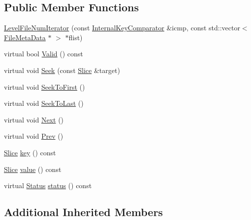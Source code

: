 \subsection*{Public Member Functions}
\begin{DoxyCompactItemize}
\item 
\mbox{\hyperlink{classleveldb_1_1_version_1_1_level_file_num_iterator_a7d9b5b7c74d74974ae322d20535f112a}{Level\+File\+Num\+Iterator}} (const \mbox{\hyperlink{classleveldb_1_1_internal_key_comparator}{Internal\+Key\+Comparator}} \&icmp, const std\+::vector$<$ \mbox{\hyperlink{structleveldb_1_1_file_meta_data}{File\+Meta\+Data}} $\ast$ $>$ $\ast$flist)
\item 
virtual bool \mbox{\hyperlink{classleveldb_1_1_version_1_1_level_file_num_iterator_a9bf0e045961ed325d37bfaa8b2c77e8b}{Valid}} () const
\item 
virtual void \mbox{\hyperlink{classleveldb_1_1_version_1_1_level_file_num_iterator_adbe855f4a783c2f578e1ff2fbb5259b2}{Seek}} (const \mbox{\hyperlink{classleveldb_1_1_slice}{Slice}} \&target)
\item 
virtual void \mbox{\hyperlink{classleveldb_1_1_version_1_1_level_file_num_iterator_a8e5d34bf0c1e17e83bbb9941821a7ee2}{Seek\+To\+First}} ()
\item 
virtual void \mbox{\hyperlink{classleveldb_1_1_version_1_1_level_file_num_iterator_ac7fafc33c049d1e33fdf9b5ae99f73d8}{Seek\+To\+Last}} ()
\item 
virtual void \mbox{\hyperlink{classleveldb_1_1_version_1_1_level_file_num_iterator_a7f470d4bd4dd27ff653bd1e61ccfd759}{Next}} ()
\item 
virtual void \mbox{\hyperlink{classleveldb_1_1_version_1_1_level_file_num_iterator_ab39c60a98d579590231034fdb665cb42}{Prev}} ()
\item 
\mbox{\hyperlink{classleveldb_1_1_slice}{Slice}} \mbox{\hyperlink{classleveldb_1_1_version_1_1_level_file_num_iterator_af89babdc6efb44a125b9ec597fc96bd8}{key}} () const
\item 
\mbox{\hyperlink{classleveldb_1_1_slice}{Slice}} \mbox{\hyperlink{classleveldb_1_1_version_1_1_level_file_num_iterator_af7b7da923a316d8b85f7194c926470db}{value}} () const
\item 
virtual \mbox{\hyperlink{classleveldb_1_1_status}{Status}} \mbox{\hyperlink{classleveldb_1_1_version_1_1_level_file_num_iterator_a173217ee0e689944ba052b1d07d2e58a}{status}} () const
\end{DoxyCompactItemize}
\subsection*{Additional Inherited Members}


